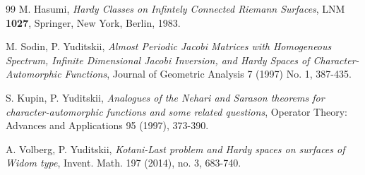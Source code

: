 \documentclass[reqno,11pt,centertags]{article}
\newcommand{\bbR}{{\mathbb{R}}}
\theoremstyle{definition}
\begin{document}
\begin{thebibliography}{99}
%
 M. Hasumi,
\emph{Hardy Classes on Infintely Connected Riemann Surfaces},
LNM \textbf{1027}, Springer, New York, Berlin, 1983.

M. Sodin, P. Yuditskii, \emph{Almost Periodic Jacobi Matrices with Homogeneous Spectrum, Infinite Dimensional Jacobi Inversion, and Hardy Spaces of Character-Automorphic Functions}, Journal of Geometric Analysis
7 (1997) No. 1, 387-435.

S. Kupin, P. Yuditskii, \emph{Analogues of the Nehari and Sarason theorems for character-automorphic
functions and some related questions}, Operator Theory: Advances and Applications 95 (1997), 373-390.


A. Volberg, P. Yuditskii,
\emph{Kotani-Last problem and Hardy spaces on surfaces of Widom type},
Invent. Math. 197 (2014), no. 3, 683-740.




\end{thebibliography}
\end{document}
